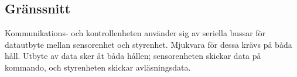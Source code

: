 \documentclass[a4paper,11pt]{article}
\begin{document}
%
%

\subsection{Gränssnitt} \label{ssec:brainInterface}
Kommunikations- och kontrollenheten använder sig av seriella bussar för datautbyte mellan sensorenhet och styrenhet. Mjukvara för dessa krävs på båda håll. Utbyte av data sker åt båda hållen; sensorenheten skickar data på kommando, och styrenheten skickar avläsningsdata.
\end{document}
